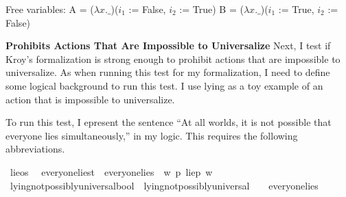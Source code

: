 \begin{isabellebody}
{  Free variables:
    A = ($\lambda x. \_$)($i_1$ := False, $i_2$ := True)
    B = ($\lambda x. \_$)($i_1$ := True, $i_2$ := False) \color{black}%
}%
\endisatagproof
{\isafoldproof}%
%
\isadelimproof
%
\endisadelimproof
%
\begin{isamarkuptext}%
\noindent \textbf{Prohibits Actions That Are Impossible to Universalize} Next, I test if Kroy's
formalization is strong enough to prohibit actions that are impossible to universalize. As when running
this test for my formalization, I need to define some logical background to run this test. I 
use lying as a toy example of an action that is impossible to universalize.  

To run this test, I epresent the sentence ``At all worlds, it is 
not possible that everyone lies simultaneously,'' in my logic. This requires the following abbreviations.%
\end{isamarkuptext}\isamarkuptrue%
\isamarkupfalse%
\ lie{\isacharcolon}{\isacharcolon}os\ \isanewline
%
\isanewline
\isanewline
{}\isamarkupfalse%
\ everyone{\isacharunderscore}lies{\isacharcolon}{\isacharcolon}t\ \ {\isachardoublequoteopen}everyone{\isacharunderscore}lies\ {\isasymequiv}\ {\isasymlambda}w{\isachardot}\ {\isacharparenleft}{\isasymforall}p{\isachardot}\ {\isacharparenleft}lie{\isacharparenleft}p{\isacharparenright}\ w{\isacharparenright}{\isacharparenright}{\isachardoublequoteclose}\isanewline
%
\isanewline
%
\isanewline
\isanewline
{}\isamarkupfalse%
\ lying{\isacharunderscore}not{\isacharunderscore}possibly{\isacharunderscore}universal{\isacharcolon}{\isacharcolon}bool\ \ {\isachardoublequoteopen}lying{\isacharunderscore}not{\isacharunderscore}possibly{\isacharunderscore}universal\ {\isasymequiv}\ {\isasymTurnstile}{\isacharparenleft}\isactrlbold {\isasymnot}\ {\isacharparenleft}{\isasymdiamond}\ everyone{\isacharunderscore}lies{\isacharparenright}{\isacharparenright}{\isachardoublequoteclose}\isanewline
%
\end{isabellebody}
